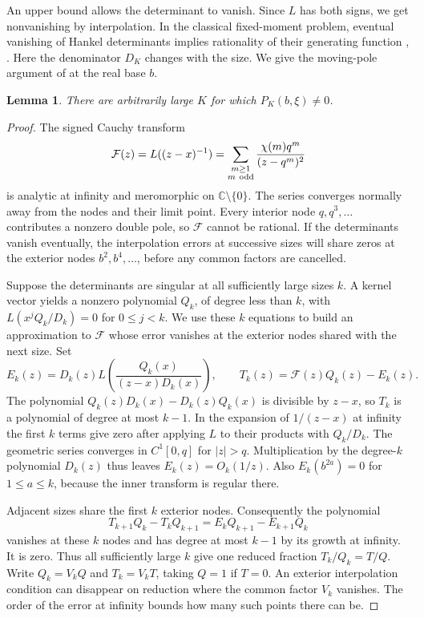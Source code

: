 \documentclass[11pt,letterpaper]{article}
\newcommand{\C}{\mathbb C}
\newcommand{\FF}{\mathcal F}
\newtheorem{lemma}[theorem]{Lemma}
\begin{document}
An upper bound allows the determinant to vanish. Since \(L\) has both
signs, we get nonvanishing by interpolation. In the classical
fixed-moment problem, eventual vanishing of Hankel determinants implies
rationality of their generating function \cite[Arts.~VII and IX]{kron},
\cite[\S4]{zudilin}. Here the denominator \(D_K\) changes with the size.
We give the moving-pole argument of \cite[Proposition~7.1]{uplift} at
the real base \(b\).

\newpage
\begin{lemma}\label{lem:nonzero}
There are arbitrarily large \(K\) for which \(P_K(b,\xi)\ne0\).
\end{lemma}
\begin{proof}
The signed Cauchy transform
\[
 \FF(z)=L((z-x)^{-1})=
 \sum_{\substack{m\ge1\\m\ {\rm odd}}}\frac{\chi(m)q^m}{(z-q^m)^2}
\]
is analytic at infinity and meromorphic on \(\C\setminus\{0\}\).
The series converges normally away from the nodes and their limit point.
Every interior node \(q,q^3,\ldots\) contributes a nonzero double pole,
so \(\FF\) cannot be rational. If the determinants vanish eventually,
the interpolation errors at successive sizes will share zeros at the
exterior nodes \(b^2,b^4,\ldots\), before any common factors are cancelled.

Suppose the determinants are singular at all sufficiently large sizes
\(k\). A kernel vector yields a nonzero polynomial \(Q_k\), of degree
less than \(k\), with \(L(x^j Q_k/D_k)=0\) for \(0\le j<k\).
We use these \(k\) equations to build an approximation to \(\FF\) whose
error vanishes at the exterior nodes shared with the next size. Set
\[
 E_k(z)=D_k(z)L\!\left(\frac{Q_k(x)}{(z-x)D_k(x)}\right),\qquad
 T_k(z)=\FF(z)Q_k(z)-E_k(z).
\]
The polynomial \(Q_k(z)D_k(x)-D_k(z)Q_k(x)\) is divisible by \(z-x\),
so \(T_k\) is a polynomial of degree at most \(k-1\). In the expansion
of \(1/(z-x)\) at infinity the first \(k\) terms give zero after
applying \(L\) to their products with \(Q_k/D_k\). The geometric series
converges in \(C^1[0,q]\) for \(|z|>q\). Multiplication by the degree-\(k\)
polynomial \(D_k(z)\) thus leaves \(E_k(z)=O_k(1/z)\).
Also \(E_k(b^{2a})=0\) for \(1\le a\le k\), because the inner transform
is regular there.

Adjacent sizes share the first \(k\) exterior nodes. Consequently the
polynomial
\[
 T_{k+1}Q_k-T_k Q_{k+1}=E_k Q_{k+1}-E_{k+1}Q_k
\]
vanishes at these \(k\) nodes and has degree at most \(k-1\) by its
growth at infinity. It is zero. Thus all sufficiently large \(k\)
give one reduced fraction \(T_k/Q_k=T/Q\). Write \(Q_k=V_kQ\) and
\(T_k=V_kT\), taking \(Q=1\) if \(T=0\). An exterior interpolation
condition can disappear on reduction where the common factor \(V_k\)
vanishes. The order of the error at infinity bounds how many such points
there can be.


\end{proof}
\end{document}
